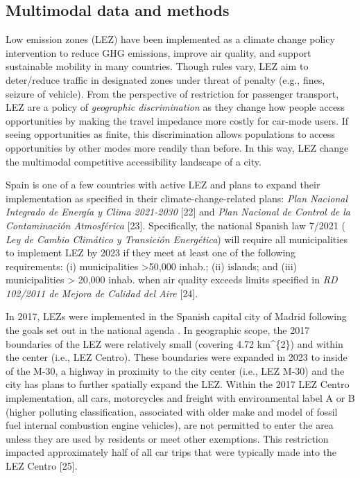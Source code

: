 \documentclass[10pt,letterpaper]{article}
\begin{document}
\hypertarget{multimodal-data-and-methods}{%
\subsection{Multimodal data and
methods}\label{multimodal-data-and-methods}}

Low emission zones (LEZ) have been implemented as a climate change
policy intervention to reduce GHG emissions, improve air quality, and
support sustainable mobility in many countries. Though rules vary, LEZ
aim to deter/reduce traffic in designated zones under threat of penalty
(e.g., fines, seizure of vehicle). From the perspective of restriction
for passenger transport, LEZ are a policy of \emph{geographic
discrimination} as they change how people access opportunities by making
the travel impedance more costly for car-mode users. If seeing
opportunities as finite, this discrimination allows populations to
access opportunities by other modes more readily than before. In this
way, LEZ change the multimodal competitive accessibility landscape of a
city.

Spain is one of a few countries with active LEZ and plans to expand
their implementation as specified in their climate-change-related plans:
\emph{Plan Nacional Integrado de Energía y Clima 2021-2030} {[}22{]} and
\emph{Plan Nacional de Control de la Contaminación Atmosférica}
{[}23{]}. Specifically, the national Spanish law 7/2021 ( \emph{Ley de
Cambio Climático y Transición Energética}) will require all
municipalities to implement LEZ by 2023 if they meet at least one of the
following requirements: (i) municipalities \textgreater50,000 inhab.;
(ii) islands; and (iii) municipalities \textgreater{} 20,000 inhab. when
air quality exceeds limits specified in \emph{RD 102/2011 de Mejora de
Calidad del Aire} {[}24{]}.

In 2017, LEZs were implemented in the Spanish capital city of Madrid
following the goals set out in the national agenda . In geographic
scope, the 2017 boundaries of the LEZ were relatively small (covering
4.72 km\^{}\{2\}) and within the center (i.e., LEZ Centro). These
boundaries were expanded in 2023 to inside of the M-30, a highway in
proximity to the city center (i.e., LEZ M-30) and the city has plans to
further spatially expand the LEZ. Within the 2017 LEZ Centro
implementation, all cars, motorcycles and freight with environmental
label A or B (higher polluting classification, associated with older
make and model of fossil fuel internal combustion engine vehicles), are
not permitted to enter the area unless they are used by residents or
meet other exemptions. This restriction impacted approximately half of
all car trips that were typically made into the LEZ Centro {[}25{]}.
\end{document}
